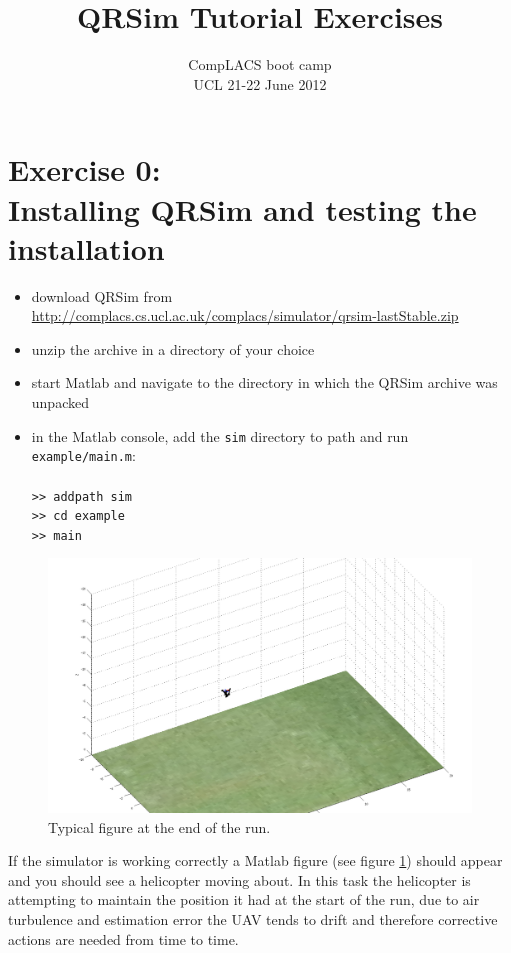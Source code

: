 \documentclass[a4paper,11pt]{article}
\title{QRSim Tutorial Exercises}
\author{{CompLACS} boot camp\\UCL 21-22 June 2012}
\date{}
\newcommand{\webrepo}{\url{http://complacs.cs.ucl.ac.uk/complacs/simulator/qrsim-lastStable.zip}\xspace}
\begin{document}
\maketitle
\section*{Exercise 0:\\Installing QRSim and testing the installation}

\begin{itemize}
 \item download QRSim from \\\webrepo
 \item unzip the archive in a directory of your choice
 \item start Matlab and navigate to the directory in which the QRSim archive was unpacked
 \item in the Matlab console, add the \texttt{sim} directory to path and run \texttt{example/main.m}:\\
  \texttt{\\
  >> addpath sim\\
  >> cd example\\
  >> main}
\end{itemize}
\begin{figure}[!b]
\includegraphics[width=13cm]{fig/main.jpg}
 \caption{Typical figure at the end of the run.\label{fig:main}}
\end{figure}
If the simulator is working correctly a Matlab figure (see figure \ref{fig:main}) should appear and you should see a helicopter moving about. In this task the helicopter is attempting to maintain the position it had at the start of the run, due to air turbulence and estimation error the UAV tends to drift and therefore corrective actions are needed from time to time. 
\end{document}
